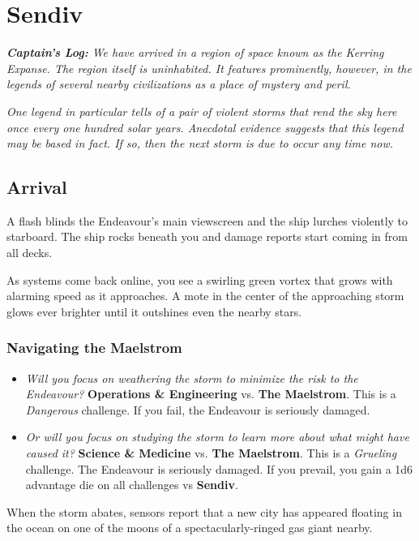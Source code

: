 \documentclass[11pt, a5paper, parskip=half-, DIV=12]{scrartcl}
\begin{document}
\section*{Sendiv}
\textit{\textbf{Captain's Log:} We have arrived in a region of space known as the Kerring Expanse. The region itself is uninhabited. It features prominently, however, in the legends of several nearby civilizations as a place of mystery and peril.}

\textit{One legend in particular tells of a pair of violent storms that rend the sky here once every one hundred solar years.  Anecdotal evidence suggests that this legend may be based in fact.  If so, then the next storm is due to occur any time now.}%

\subsection*{Arrival}
A flash blinds the Endeavour's main viewscreen and the ship lurches violently to starboard. The ship rocks beneath you and damage reports start coming in from all decks.

As systems come back online, you see a swirling green vortex that grows with alarming speed as it approaches. A mote in the center of the approaching storm glows ever brighter until it outshines even the nearby stars. 

\subsubsection*{Navigating the Maelstrom}
\begin{itemize}
	\item \textit{Will you focus on weathering the storm to minimize the risk to the Endeavour?} \textbf{Operations \& Engineering} vs. \textbf{The Maelstrom}. This is a \textit{Dangerous} challenge. If you fail, the Endeavour is seriously damaged.
	\item \textit{Or will you focus on studying the storm to learn more about what might have caused it?} \textbf{Science \& Medicine} vs. \textbf{The Maelstrom}. This is a \textit{Grueling} challenge. The Endeavour is seriously damaged. If you prevail, you gain a 1d6 advantage die on all challenges vs \textbf{Sendiv}.
\end{itemize}

When the storm abates, sensors report that a new city has appeared floating in the ocean on one of the moons of a spectacularly-ringed gas giant nearby.
\newpage
\end{document}
